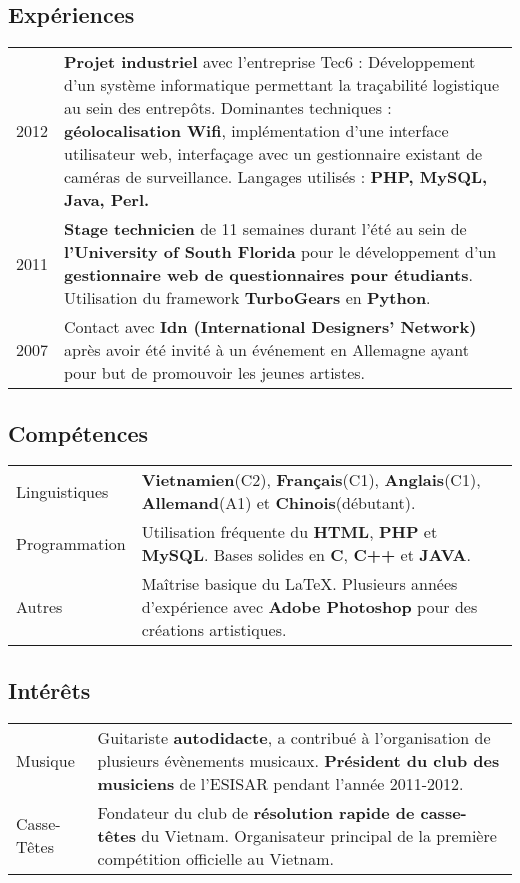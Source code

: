 \documentclass[11pt,a4paper]{article}
\begin{document}
\subsection*{Expériences}
\noindent \begin{tabular}{@{}p{\annee}p{\texte}@{}}
2012 & \textbf{Projet industriel} avec l'entreprise Tec6 : Développement d'un système informatique permettant la traçabilité logistique au sein des entrepôts. Dominantes techniques : \textbf{géolocalisation Wifi}, implémentation d'une interface utilisateur web, interfaçage avec un gestionnaire existant de caméras de surveillance. Langages utilisés : \textbf{PHP, MySQL, Java, Perl.}\\
2011 & \textbf{Stage technicien} de 11 semaines durant l'été au sein de \textbf{l'University of South Florida} pour le développement d'un \textbf{gestionnaire web de questionnaires pour étudiants}. Utilisation du framework \textbf{TurboGears} en \textbf{Python}.\\
2007 & Contact avec \textbf{Idn (International Designers’ Network)} après avoir été invité à un événement
en Allemagne ayant pour but de promouvoir les jeunes artistes.\\
\end{tabular}
\subsection*{Compétences}
\noindent \begin{tabular}{@{}p{\annee}p{\texte}@{}}
Linguistiques & \textbf{Vietnamien}(C2), \textbf{Français}(C1), \textbf{Anglais}(C1), \textbf{Allemand}(A1) et \textbf{Chinois}(débutant).\\
Programmation & Utilisation fréquente du \textbf{HTML}, \textbf{PHP} et \textbf{MySQL}. Bases solides en \textbf{C}, \textbf{C++} et \textbf{JAVA}.\\
Autres & Maîtrise basique du \LaTeX. Plusieurs années d'expérience avec \textbf{Adobe Photoshop} pour des créations artistiques.\\
\end{tabular}
\subsection*{Intérêts}
\noindent \begin{tabular}{@{}p{\annee}p{\texte}@{}}
Musique & Guitariste \textbf{autodidacte}, a contribué à l'organisation de plusieurs évènements musicaux. \textbf{Président du club des musiciens} de l'ESISAR pendant l'année 2011-2012.\\
Casse-Têtes & Fondateur du club de \textbf{résolution rapide de casse-têtes} du Vietnam. Organisateur principal de la première compétition officielle au Vietnam. 
\end{tabular}
\end{document}
